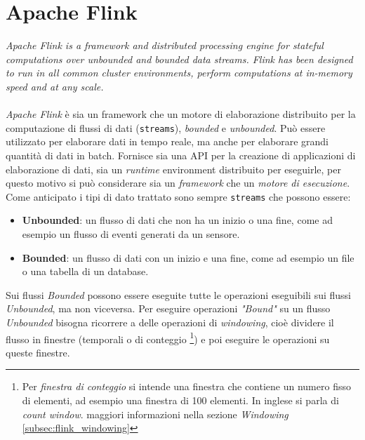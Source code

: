 \section{Apache Flink}
\label{sec:flink_overview}
\textit{Apache Flink is a framework and distributed processing engine for stateful computations over unbounded and bounded data streams. Flink has been designed to run in all common cluster environments, perform computations at in-memory speed and at any scale.}\cite*{flinkwebsite}\\\\
\textit{Apache Flink} è sia un framework che un motore di elaborazione distribuito per la computazione di flussi di dati (\texttt{streams}), \textit{bounded} e \textit{unbounded}.
Può essere utilizzato per elaborare dati in tempo reale, ma anche per elaborare grandi quantità di dati in batch.
Fornisce sia una API per la creazione di applicazioni di elaborazione di dati, sia un \textit{runtime} environment distribuito per eseguirle,
per questo motivo si può considerare sia un \textit{framework} che un \textit{motore di esecuzione}.
Come anticipato i tipi di dato trattato sono sempre \texttt{streams} che possono essere:
\begin{itemize}
    \item \textbf{Unbounded}: un flusso di dati che non ha un inizio o una fine, come ad esempio un flusso di eventi generati da un sensore.
    \item \textbf{Bounded}: un flusso di dati con un inizio e una fine, come ad esempio un file o una tabella di un database.
\end{itemize}
Sui flussi \textit{Bounded} possono essere eseguite tutte le operazioni eseguibili sui flussi \textit{Unbounded}, ma non viceversa.
Per eseguire operazioni \textit{"Bound"} su un flusso \textit{Unbounded} bisogna ricorrere a delle operazioni di \textit{windowing},
cioè dividere il flusso in finestre (temporali o di conteggio 
\footnote{Per \textit{finestra di conteggio} si intende una finestra che contiene un numero fisso di elementi, ad esempio una finestra di 100 elementi.
In inglese si parla di \textit{count window}. maggiori informazioni nella sezione \textit{Windowing} \ref{subsec:flink_windowing}})
e poi eseguire le operazioni su queste finestre.

